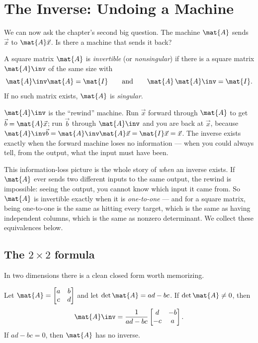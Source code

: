 \section{The Inverse: Undoing a Machine}
\label{ch08:inverse}

We can now ask the chapter's second big question. The machine $\mat{A}$ sends $\vec{x}$
to $\mat{A}\vec{x}$. Is there a machine that sends it back?

\begin{definition}
\label{ch08:inv-def}
A square matrix $\mat{A}$ is \emph{invertible} (or \emph{nonsingular}) if there is a
square matrix $\mat{A}\inv$ of the same size with
\[
\mat{A}\inv \mat{A} = \mat{I} \qquad\text{and}\qquad \mat{A}\,\mat{A}\inv = \mat{I}.
\]
If no such matrix exists, $\mat{A}$ is \emph{singular}.
\end{definition}

\begin{intuitionbox}
$\mat{A}\inv$ is the ``rewind'' machine. Run $\vec{x}$ forward through $\mat{A}$ to get
$\vec{b} = \mat{A}\vec{x}$; run $\vec{b}$ through $\mat{A}\inv$ and you are back at
$\vec{x}$, because $\mat{A}\inv\vec{b} = \mat{A}\inv\mat{A}\vec{x} = \mat{I}\vec{x} = \vec{x}$. The inverse exists exactly when the forward machine loses no information ---
when you could always tell, from the output, what the input must have been.
\end{intuitionbox}

This information-loss picture is the whole story of \emph{when} an inverse exists. If
$\mat{A}$ ever sends two different inputs to the same output, the rewind is impossible:
seeing the output, you cannot know which input it came from. So $\mat{A}$ is invertible
exactly when it is \emph{one-to-one} --- and for a square matrix, being one-to-one is the
same as hitting every target, which is the same as having independent columns, which is
the same as nonzero determinant. We collect these equivalences below.

\subsection{The $2\times2$ formula}

In two dimensions there is a clean closed form worth memorizing.

\begin{theorem}
\label{ch08:2x2inv}
Let $\mat{A} = \begin{bmatrix} a & b \\ c & d \end{bmatrix}$ and let
$\det\mat{A} = ad - bc$. If $\det\mat{A}\ne 0$, then
\[
\mat{A}\inv = \frac{1}{ad-bc}\begin{bmatrix} d & -b \\ -c & a \end{bmatrix}.
\]
If $ad - bc = 0$, then $\mat{A}$ has no inverse.
\end{theorem}

